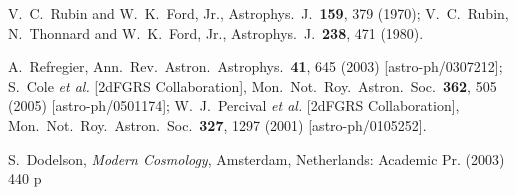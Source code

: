 \documentclass[12pt]{article}
\begin{document}
{{%

\begin{thebibliography}{999}

  V.~C.~Rubin and W.~K.~Ford, Jr.,
  Astrophys.\ J.\  {\bf 159}, 379 (1970);
  V.~C.~Rubin, N.~Thonnard and W.~K.~Ford, Jr.,
Astrophys.\ J.\  {\bf 238}, 471 (1980).
  
  A.~Refregier,
  Ann.\ Rev.\ Astron.\ Astrophys.\  {\bf 41}, 645 (2003)
  [astro-ph/0307212];
  S.~Cole {\it et al.}  [2dFGRS Collaboration],
  Mon.\ Not.\ Roy.\ Astron.\ Soc.\  {\bf 362}, 505 (2005) [astro-ph/0501174];
W.~J.~Percival {\it et al.}  [2dFGRS Collaboration],
 Mon.\ Not.\ Roy.\ Astron.\ Soc.\  {\bf 327}, 1297 (2001) [astro-ph/0105252].



  S.~Dodelson,
  {\it Modern Cosmology},
  Amsterdam, Netherlands: Academic Pr. (2003) 440 p

  

\end{thebibliography}}}
\end{document}
